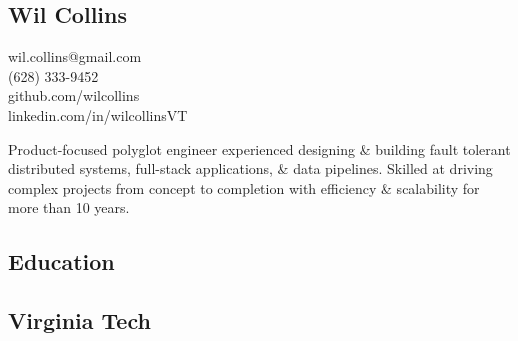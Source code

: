 \documentclass[]{resume}
\begin{document}
\nopagecolor{}

%
%
\lastupdated

%
%
%


%
%

\begin{minipage}[t]{0.35\textwidth} 
  \begin{blackhighlight}

    \section{Wil Collins}
    wil.collins@gmail.com \\
    (628) 333-9452  \\
    github.com/wilcollins \\
    linkedin.com/in/wilcollinsVT 
  \end{blackhighlight}
  \sectionsep



\begin{grayhighlight}
Product-focused polyglot engineer experienced designing \& building fault tolerant distributed systems, full-stack applications, \& data pipelines. Skilled at driving complex projects from concept to completion with efficiency \& scalability for more than 10 years.
\end{grayhighlight}

\sectionsep

\begin{grayhighlight}
\section{Education} 

\subsection{Virginia Tech}


\end{grayhighlight}
\end{minipage}
\end{document}
